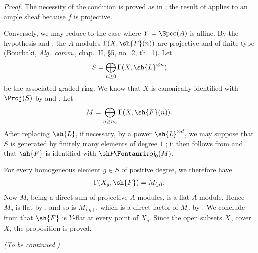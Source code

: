 \begin{proof}
The necessity of the condition is proved as in
; the result of  applies
to an ample sheaf because $f$ is projective.

Conversely, we may reduce to the case where
$Y=\Spec(A)$ is affine.  By the hypothesis and
, the $A$-modules
$\Gamma(X,\sh{F}(n))$ are projective and of finite type
(Bourbaki, \emph{Alg.~comm.}, chap.~II, \S5, no.~2,
th.~1).  Let
\[
  S=\bigoplus_{n\geq0}\Gamma(X,\sh{L}^{\otimes n})
\]
be the associated graded ring.  We know that $X$ is
canonically identified with $\Proj(S)$ by
 and .  Let
\[
  M=\bigoplus_{n\geq n_0}\Gamma(X,\sh{F}(n)).
\]
After replacing $\sh{L}$, if necessary, by a power
$\sh{L}^{\otimes d}$, we may suppose that $S$ is
generated by finitely many elements of degree $1$
; it then follows from
 and  that $\sh{F}$ is
identified with $\shProj_0(M)$.

For every homogeneous element $g\in S$ of positive
degree, we therefore have
\[
  \Gamma(X_g,\sh{F})=M_{(g)}.
\]
Now $M$, being a direct sum of projective $A$-modules, is
a flat $A$-module.  Hence $M_g$ is flat by
, and so is $M_{(g)}$, which is a direct
factor of $M_g$ by .  We conclude from
 that $\sh{F}$ is $Y$-flat at every
point of $X_g$.  Since the open subsets $X_g$ cover $X$,
the proposition is proved.
\end{proof}

\bigskip
\noindent\emph{(To be continued.)}
